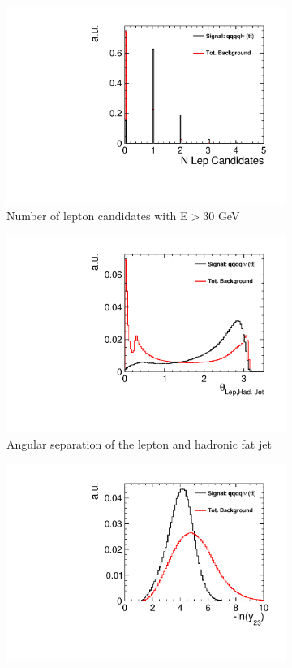 \begin{figure}[]\ContinuedFloat 
  \begin{subfigure}[b]{0.5\linewidth}
    \centering
    \includegraphics[width=0.75\linewidth]{TopAnalysis/figures/BDTVariables/NLeptonCandidates.pdf} 
    \caption{Number of lepton candidates with E$>$30 GeV } 
    \vspace{4ex}
  \end{subfigure}%
  \begin{subfigure}[b]{0.5\linewidth}
    \centering
    \includegraphics[width=0.75\linewidth]{TopAnalysis/figures/BDTVariables/TopLepDira.pdf} 
    \caption{Angular separation of the lepton and hadronic fat jet} 
    \vspace{4ex}
  \end{subfigure} 
  \begin{subfigure}[b]{0.5\linewidth}
    \centering
    \includegraphics[width=0.75\linewidth]{TopAnalysis/figures/BDTVariables/Y23.pdf} 

\end{subfigure}
\end{figure}
